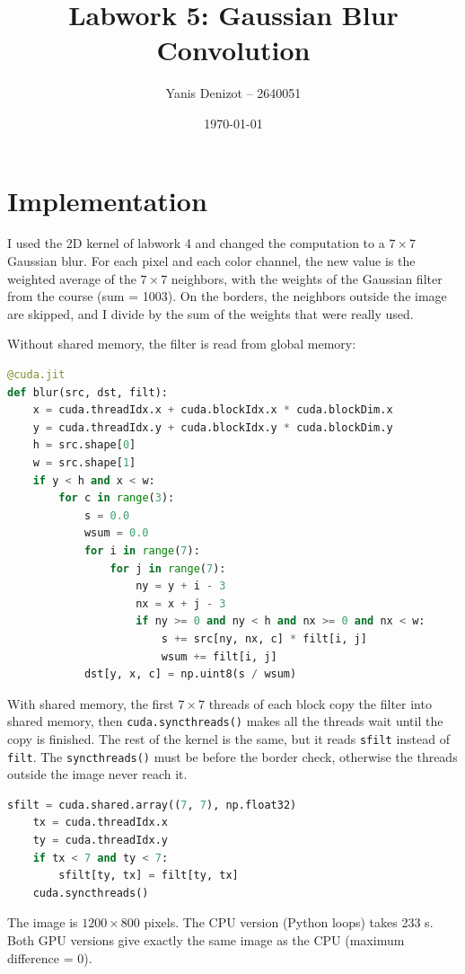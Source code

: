 \documentclass[11pt,a4paper]{article}
\title{Labwork 5: Gaussian Blur Convolution}
\author{Yanis Denizot -- 2640051}
\date{\today}
\begin{document}
\maketitle

\section{Implementation}
I used the 2D kernel of labwork 4 and changed the computation to a $7 \times 7$ Gaussian blur.
For each pixel and each color channel, the new value is the weighted average of the
$7 \times 7$ neighbors, with the weights of the Gaussian filter from the course (sum = 1003).
On the borders, the neighbors outside the image are skipped, and I divide by the sum of the
weights that were really used.

Without shared memory, the filter is read from global memory:
\begin{lstlisting}[language=Python]
@cuda.jit
def blur(src, dst, filt):
    x = cuda.threadIdx.x + cuda.blockIdx.x * cuda.blockDim.x
    y = cuda.threadIdx.y + cuda.blockIdx.y * cuda.blockDim.y
    h = src.shape[0]
    w = src.shape[1]
    if y < h and x < w:
        for c in range(3):
            s = 0.0
            wsum = 0.0
            for i in range(7):
                for j in range(7):
                    ny = y + i - 3
                    nx = x + j - 3
                    if ny >= 0 and ny < h and nx >= 0 and nx < w:
                        s += src[ny, nx, c] * filt[i, j]
                        wsum += filt[i, j]
            dst[y, x, c] = np.uint8(s / wsum)
\end{lstlisting}

With shared memory, the first $7 \times 7$ threads of each block copy the filter into shared
memory, then \texttt{cuda.syncthreads()} makes all the threads wait until the copy is
finished. The rest of the kernel is the same, but it reads \texttt{sfilt} instead of
\texttt{filt}. The \texttt{syncthreads()} must be before the border check, otherwise the
threads outside the image never reach it.
\begin{lstlisting}[language=Python]
    sfilt = cuda.shared.array((7, 7), np.float32)
    tx = cuda.threadIdx.x
    ty = cuda.threadIdx.y
    if tx < 7 and ty < 7:
        sfilt[ty, tx] = filt[ty, tx]
    cuda.syncthreads()
\end{lstlisting}

The image is $1200 \times 800$ pixels. The CPU version (Python loops) takes 233 s. Both GPU
versions give exactly the same image as the CPU (maximum difference = 0).
\end{document}
